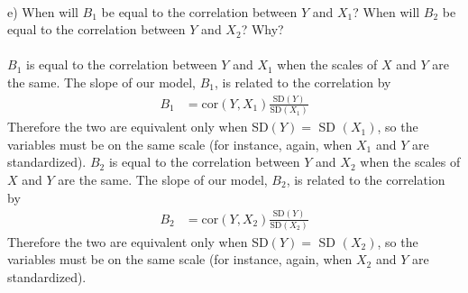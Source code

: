 \documentclass[onecolumn,10pt]{jhwhw}
\begin{document}
\\
e) When will $B_1$ be equal to the correlation between $Y$ and $X_1$? When will $B_2$ be equal to the correlation between $Y$ and $X_2$? Why?\\
\\
$B_1$ is equal to the correlation between $Y$ and $X_1$ when the scales of $X$ and $Y$ are the same. The slope of our model, $B_1$, is related to the correlation by
\begin{align*}
B_1 &= \mbox{cor}(Y, X_1) \frac{\mbox{SD}(Y)}{\mbox{SD}(X_1)}
\end{align*}
Therefore the two are equivalent only when SD$(Y) = $ SD $(X_1)$, so the variables must be on the same scale (for instance, again, when $X_1$ and $Y$ are standardized). $B_2$ is equal to the correlation between $Y$ and $X_2$ when the scales of $X$ and $Y$ are the same. The slope of our model, $B_2$, is related to the correlation by
\begin{align*}
B_2 &= \mbox{cor}(Y, X_2) \frac{\mbox{SD}(Y)}{\mbox{SD}(X_2)}
\end{align*}
Therefore the two are equivalent only when SD$(Y) = $ SD $(X_2)$, so the variables must be on the same scale (for instance, again, when $X_2$ and $Y$ are standardized).\\
\\
\end{document}
